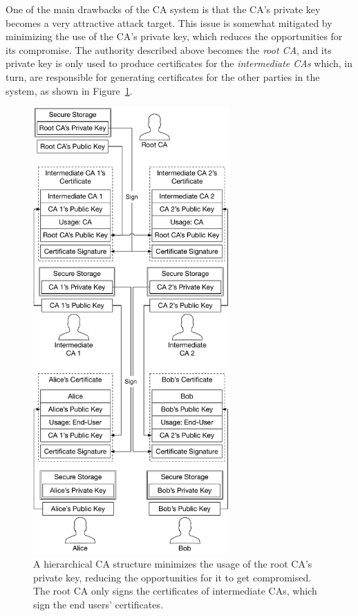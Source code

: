 One of the main drawbacks of the CA system is that the CA's private key becomes
a very attractive attack target. This issue is somewhat mitigated by minimizing
the use of the CA's private key, which reduces the opportunities for its
compromise. The authority described above becomes the \textit{root CA}, and its
private key is only used to produce certificates for the
\textit{intermediate CAs} which, in turn, are responsible for generating
certificates for the other parties in the system, as shown in
Figure~\ref{fig:intermediate_cas}.

\begin{figure}[hbtp]
  \centering
  \includegraphics[width=75mm]{figures/intermediate_cas.pdf}
  \caption{
    A hierarchical CA structure minimizes the usage of the root CA's private
    key, reducing the opportunities for it to get compromised. The root CA only
    signs the certificates of intermediate CAs, which sign the end users'
    certificates.
  }
  \label{fig:intermediate_cas}
\end{figure}


